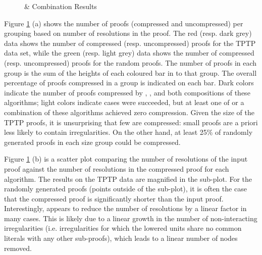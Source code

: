 {\begin{figure}[p]
 \caption{\GFOLU \& \FORPI Combination Results}
\label{fig:ex}

\end{figure}

Figure \ref{fig:ex} (a) shows the number of proofs (compressed and uncompressed) per grouping based on number of resolutions in the proof. The red (resp. dark grey) data shows the number of compressed (resp. uncompressed) proofs for the TPTP data set, while the green (resp. light grey) data shows the number of compressed (resp. uncompressed) proofs for the random proofs. The number of proofs in each group is the sum of the heights of each coloured bar in to that group. The overall percentage of proofs compressed in a group is indicated on each bar. Dark colors indicate the number of proofs compressed by {\FORPI}, {\GFOLU}, and both compositions of these algorithms; light colors indicate cases were {\FORPI} succeeded, but at least one of {\GFOLU} or a combination of these algorithms achieved zero compression. 
Given the size of the TPTP proofs, it is unsurprising that few are compressed: small proofs are a priori less likely to contain irregularities. On the other hand, 
at least 25\% of randomly generated proofs in each size group could be compressed.


Figure \ref{fig:ex} (b) is a scatter plot comparing the number of resolutions of the input proof against the number of resolutions in the compressed proof for each algorithm. The results on the TPTP data are magnified in the sub-plot. For the randomly generated proofs (points outside of the sub-plot), it is often the case that the compressed proof is significantly shorter than the input proof. Interestingly, {\GFOLU} appears to reduce the number of resolutions by a linear factor in many cases. This is likely due to a linear growth in the number of non-interacting irregularities (i.e. irregularities for which the lowered units share no common literals with any other sub-proofs), which leads to a linear number of nodes removed.


}
